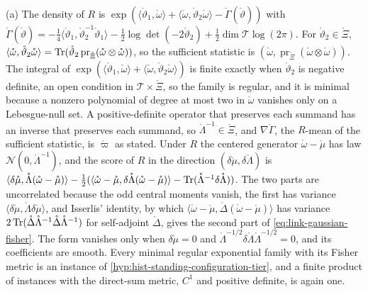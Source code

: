 (a) The density of $R$ is
$\exp(\langle\mathring\vartheta_1,\mathring\omega\rangle+\langle\mathring\omega,\mathring\vartheta_2\mathring\omega\rangle-\mathring\Gamma(\mathring\vartheta))$
with
$\mathring\Gamma(\mathring\vartheta)=-\tfrac14\langle\mathring\vartheta_1,\mathring\vartheta_2^{-1}\mathring\vartheta_1\rangle-\tfrac12\log\det(-2\mathring\vartheta_2)+\tfrac12\dim\mathscr T\log(2\pi)$.
For $\mathring\vartheta_2\in\mathring\Xi$,
$\langle\mathring\omega,\mathring\vartheta_2\mathring\omega\rangle=\operatorname{Tr}(\mathring\vartheta_2\operatorname{pr}_{\mathring\Xi}(\mathring\omega\otimes\mathring\omega))$,
so the sufficient statistic is
$(\mathring\omega,\operatorname{pr}_{\mathring\Xi}(\mathring\omega\otimes\mathring\omega))$.
The integral of $\exp(\langle\mathring\vartheta_1,\mathring\omega\rangle+\langle\mathring\omega,\mathring\vartheta_2\mathring\omega\rangle)$
is finite exactly when $\mathring\vartheta_2$ is negative definite, an open condition in
$\mathscr T\times\mathring\Xi$, so the family is regular, and it is minimal because a nonzero polynomial
of degree at most two in $\mathring\omega$ vanishes only on a Lebesgue-null set. A positive-definite
operator that preserves each summand has an inverse that preserves each summand, so
$\mathring\Lambda^{-1}\in\mathring\Xi$, and $\nabla\mathring\Gamma$, the $R$-mean of the sufficient
statistic, is $\mathring\varpi$ as stated. Under $R$ the centered generator
$\mathring\omega-\mathring\mu$ has law $\mathcal N(0,\mathring\Lambda^{-1})$, and the score of $R$ in the
direction $(\delta\mathring\mu,\delta\mathring\Lambda)$ is
$\langle\delta\mathring\mu,\mathring\Lambda(\mathring\omega-\mathring\mu)\rangle-\tfrac12(\langle\mathring\omega-\mathring\mu,\delta\mathring\Lambda(\mathring\omega-\mathring\mu)\rangle-\operatorname{Tr}(\mathring\Lambda^{-1}\delta\mathring\Lambda))$.
The two parts are uncorrelated because the odd central moments vanish, the first has variance
$\langle\delta\mathring\mu,\mathring\Lambda\delta\mathring\mu\rangle$, and Isserlis' identity, by which
$\langle\mathring\omega-\mathring\mu,\mathring\Delta(\mathring\omega-\mathring\mu)\rangle$ has variance
$2\operatorname{Tr}(\mathring\Delta\mathring\Lambda^{-1}\mathring\Delta\mathring\Lambda^{-1})$ for self-adjoint $\mathring\Delta$, gives the second part of
\eqref{eq:link-gaussian-fisher}. The form vanishes only
when $\delta\mathring\mu=0$ and $\mathring\Lambda^{-1/2}\delta\mathring\Lambda\mathring\Lambda^{-1/2}=0$,
and its coefficients are smooth. Every minimal regular exponential family with its Fisher metric is an
instance of \cref{hyp:hist-standing-configuration-tier}, and a finite product of instances with the
direct-sum metric, $C^1$ and positive definite, is again one.

